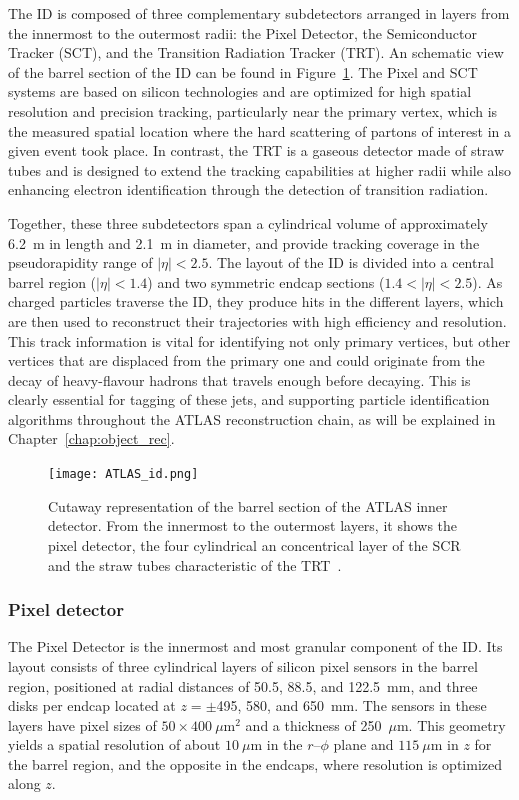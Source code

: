 The ID is composed of three complementary subdetectors arranged in layers from the innermost to the outermost radii: the Pixel Detector, the Semiconductor Tracker (SCT), and the Transition Radiation Tracker (TRT). An schematic view of the barrel section of the ID can be found in Figure~\ref{fig:id}.
The Pixel and SCT systems are based on silicon technologies and are optimized for high spatial resolution and precision tracking, particularly near the primary vertex, which is the measured spatial location where the hard scattering of partons of interest in a given event took place. In contrast, the TRT is a gaseous detector made of straw tubes and is designed to extend the tracking capabilities at higher radii while also enhancing electron identification through the detection of transition radiation.

Together, these three subdetectors span a cylindrical volume of approximately 6.2~m in length and 2.1~m in diameter, and provide tracking coverage in the pseudorapidity range of $|\eta| < 2.5$. The layout of the ID is divided into a central barrel region ($|\eta| < 1.4$) and two symmetric endcap sections ($1.4 < |\eta| < 2.5$). As charged particles traverse the ID, they produce hits in the different layers, which are then used to reconstruct their trajectories with high efficiency and resolution. This track information is vital for identifying not only primary vertices, but other vertices that are displaced from the primary one and could originate from the decay of heavy-flavour hadrons that travels enough before decaying. This is clearly essential for tagging of these jets, and supporting particle identification algorithms throughout the ATLAS reconstruction chain, as will be explained in Chapter~\ref{chap:object_rec}.
\begin{figure}[htbp]
    \centering
        \texttt{[image: ATLAS\_id.png]}
    \caption{Cutaway representation of the barrel section of the ATLAS inner detector. From the innermost to the outermost layers, it shows the pixel detector, the four cylindrical an concentrical layer of the SCR and the straw tubes characteristic of the TRT~\cite{Collaboration:2723878}.}
    \label{fig:id}
\end{figure}

\subsubsection*{Pixel detector}

The Pixel Detector is the innermost and most granular component of the ID. Its layout consists of three cylindrical layers of silicon pixel sensors in the barrel region, positioned at radial distances of 50.5, 88.5, and 122.5~mm, and three disks per endcap located at $z = \pm$495, 580, and 650~mm. The sensors in these layers have pixel sizes of $50 \times 400~\mu\text{m}^2$ and a thickness of 250~$\mu$m. This geometry yields a spatial resolution of about $10~\mu$m in the $r\text{--}\phi$ plane and $115~\mu$m in $z$ for the barrel region, and the opposite in the endcaps, where resolution is optimized along $z$.


